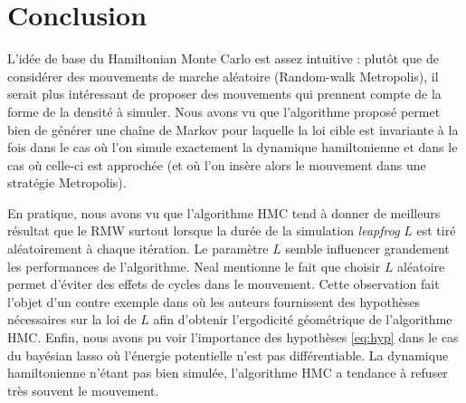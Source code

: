\documentclass[10pt,a4paper]{article}
\begin{document}
\section{Conclusion}
L'idée de base du Hamiltonian Monte Carlo est assez intuitive : plutôt que de considérer des mouvements de marche aléatoire (Random-walk Metropolis), il serait plus intéressant de proposer des mouvements qui prennent compte de la forme de la densité à simuler. Nous avons vu que l'algorithme proposé permet bien de générer une chaîne de Markov pour laquelle la loi cible est invariante à la fois dans le cas où l'on simule exactement la dynamique hamiltonienne et dans le cas où celle-ci est approchée (et où l'on insère alors le mouvement dans une stratégie Metropolis).

En pratique, nous avons vu que l'algorithme HMC tend à donner de meilleurs résultat que le RMW surtout lorsque la durée de la simulation {\it leapfrog} $L$ est tiré aléatoirement à chaque itération. Le paramètre $L$ semble influencer grandement les performances de l'algorithme. Neal \cite{Neal-hmc} mentionne le fait que choisir $L$ aléatoire permet d'éviter des effets de cycles dans le mouvement. Cette observation fait l'objet d'un contre exemple dans \cite{ergodicity-hmc} où les auteurs fournissent des hypothèses nécessaires sur la loi de $L$ afin d'obtenir l'ergodicité géométrique de l'algorithme HMC. Enfin, nous avons pu voir l'importance des hypothèses \eqref{eq:hyp} dans le cas du bayésian lasso où l'énergie potentielle n'est pas différentiable. La dynamique hamiltonienne n'étant pas bien simulée, l'algorithme HMC a tendance à refuser très souvent le mouvement. 

\pagebreak


\end{document}
